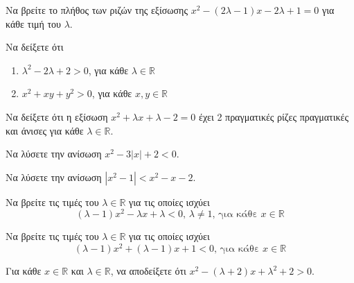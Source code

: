 \documentclass{presentation}
\begin{document}
\begin{askisi}
  Να βρείτε το πλήθος των ριζών της εξίσωσης $x^2-(2λ-1)x-2λ+1=0$ για κάθε τιμή του $λ$.
\end{askisi}

\begin{askisi}
  Να δείξετε ότι
  \begin{enumerate}[<+->]
    \item $λ^2-2λ+2>0$, για κάθε $λ\in\mathbb{R}$
    \item $x^2+xy+y^2>0$, για κάθε $x,y\in\mathbb{R}$
  \end{enumerate}
\end{askisi}

\begin{askisi}
  Να δείξετε ότι η εξίσωση $x^2+λx+λ-2=0$ έχει 2 πραγματικές ρίζες πραγματικές και άνισες για κάθε $λ\in\mathbb{R}$.
\end{askisi}

\begin{askisi}
  Να λύσετε την ανίσωση $x^2-3|x|+2<0$.
\end{askisi}


\begin{askisi}
  Να λύσετε την ανίσωση $|x^2-1|<x^2-x-2$.
\end{askisi}

\begin{askisi}
  Να βρείτε τις τιμές του $λ\in\mathbb{R}$ για τις οποίες ισχύει
  $$(λ-1)x^2-λx+λ<0 \text{, } λ\ne 1 \text{, για κάθε } x\in\mathbb{R}$$
\end{askisi}

\begin{askisi}
  Να βρείτε τις τιμές του $λ\in\mathbb{R}$ για τις οποίες ισχύει
  $$(λ-1)x^2+(λ-1)x+1<0 \text{, για κάθε } x\in\mathbb{R}$$
\end{askisi}

\begin{askisi}
  Για κάθε $x\in\mathbb{R}$ και $λ\in\mathbb{R}$, να αποδείξετε ότι $x^2-(λ+2)x+λ^2+2>0$.
\end{askisi}


\moodle
\end{document}
